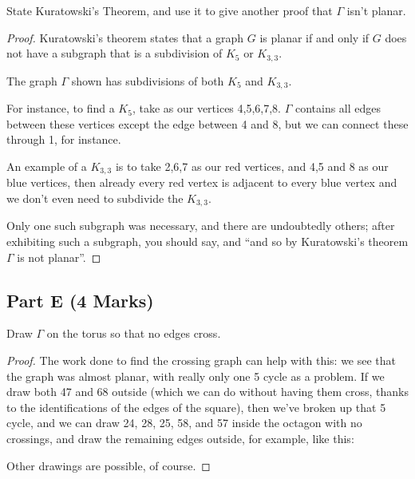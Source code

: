 \documentclass{amsart}
\begin{document}
State Kuratowski's Theorem, and use it to give another proof that $\Gamma$ isn't planar.

\begin{proof}
  Kuratowski's theorem states that a graph $G$ is planar if and only if $G$ does not have a subgraph that is a subdivision of $K_5$ or $K_{3,3}$.

 The graph $\Gamma$ shown has subdivisions of both $K_5$ and $K_{3,3}$.

For instance, to find a $K_5$, take as our vertices 4,5,6,7,8.  $\Gamma$ contains all edges between these vertices except the edge between 4 and 8, but we can connect these through 1, for instance.  

An example of a $K_{3,3}$ is to take 2,6,7 as our red vertices, and 4,5 and 8 as our blue vertices, then already every red vertex is adjacent to every blue vertex and we don't even need to subdivide the $K_{3,3}$.

Only one such subgraph was necessary, and there are undoubtedly others; after exhibiting such a subgraph, you should say, and ``and so by Kuratowski's theorem $\Gamma$ is not planar''.

  \end{proof}

\subsection*{Part E (4 Marks)}


Draw $\Gamma$ on the torus so that no edges cross.

\begin{proof}
The work done to find the crossing graph can help with this: we see that the graph was almost planar, with really only one 5 cycle as a problem.  If we draw both 47 and 68 outside (which we can do without having them cross, thanks to the identifications of the edges of the square), then we've broken up that 5 cycle, and we can draw 24, 28, 25, 58, and 57 inside the octagon with no crossings, and draw the remaining edges outside, for example, like this:

\begin{center}
\end{center}
Other drawings are possible, of course.
  \end{proof}
\end{document}
